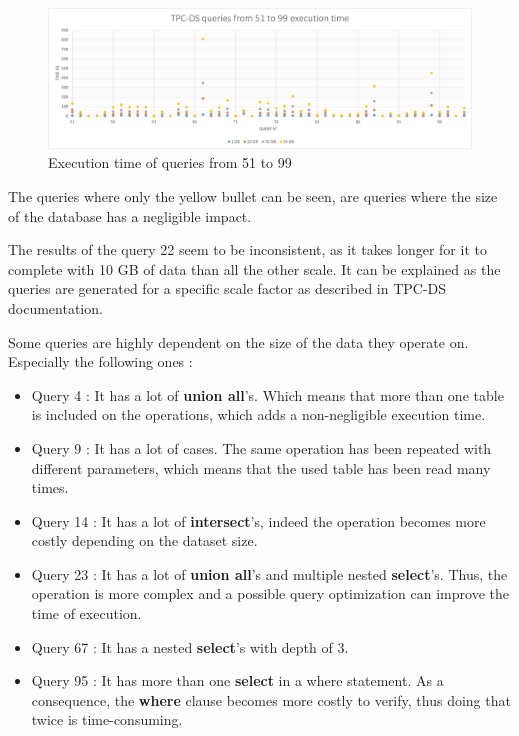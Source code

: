 \documentclass{article}
\begin{document}
\begin{figure}[H] 
\begin{adjustwidth}{-2cm}{-2cm}
\begin{center}
\includegraphics[width=20cm]{images/ExecutionTime51-99.png}
\end{center}
\end{adjustwidth}
\caption{Execution time of queries from 51 to 99}
\label{ExecutionTime51-99}
\end{figure}

The queries where only the yellow bullet can be seen, are queries where the size of the database has a negligible impact.

The results of the query 22 seem to be inconsistent, as it takes longer for it to complete with 10 GB of data than all the other scale. It can be explained as the queries are generated for a specific scale factor as described in TPC-DS documentation.

Some queries are highly dependent on the size of the data they operate on. Especially the following ones :

\begin{itemize}
    \item Query 4 : It has a lot of \textbf{union all}'s. Which means that more than one table is included on the operations, which adds a non-negligible execution time.
    \item Query 9 : It has a lot of cases. The same operation has been repeated with different parameters, which means that the used table has been read many times.
    \item Query 14 : It has a lot of \textbf{intersect}'s, indeed the operation becomes more costly depending on the dataset size.
    \item Query 23 : It has a lot of \textbf{union all}'s and multiple nested \textbf{select}'s. Thus, the operation is more complex and a possible query optimization can improve the time of execution.
    \item Query 67 : It has a nested \textbf{select}'s with depth of 3.
    \item Query 95 : It has more than one \textbf{select} in a where statement. As a consequence, the \textbf{where} clause becomes more costly to verify, thus doing that twice is time-consuming.
\end{itemize}
\end{document}
